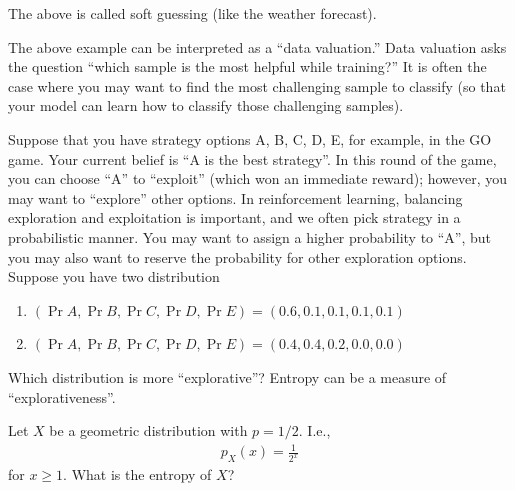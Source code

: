 \documentclass{article}
\begin{document}
\begin{remark}
    The above is called soft guessing (like the weather forecast).
\end{remark}

\begin{remark}
    The above example can be interpreted as a ``data valuation.''
Data valuation asks the question ``which sample is the most helpful while training?''
    It is often the case where you may want to find the most challenging sample to classify (so that your model can learn how to classify those challenging samples).
\end{remark}

\begin{example}
    Suppose that you have strategy options A, B, C, D, E, for example, in the GO game.
    Your current belief is ``A is the best strategy''.
    In this round of the game, you can choose ``A'' to ``exploit'' (which won an immediate reward);
however, you may want to ``explore'' other options.
    In reinforcement learning, balancing exploration and exploitation is important, 
    and we often pick strategy in a probabilistic manner.
    You may want to assign a higher probability to ``A'', but you may also want to reserve the probability for other exploration options.
    Suppose you have two distribution 
    \begin{enumerate}[(S1)]
        \item $(\Pr{A}, \Pr{B},\Pr{C},\Pr{D},\Pr{E}) = (0.6, 0.1, 0.1, 0.1, 0.1)$ 
        \item $(\Pr{A}, \Pr{B},\Pr{C},\Pr{D},\Pr{E}) = (0.4, 0.4, 0.2, 0.0, 0.0)$ 
    \end{enumerate}
    Which distribution is more ``explorative''?
    Entropy can be a measure of ``explorativeness''.
\end{example}

\begin{exercise}
    Let $X$ be a geometric distribution with $p=1/2$. I.e.,
    \begin{align}
        p_X(x) = \frac{1}{2^x}
    \end{align}
    for $x\geq 1$.
    What is the entropy of $X$?
\end{exercise}









\end{document}
